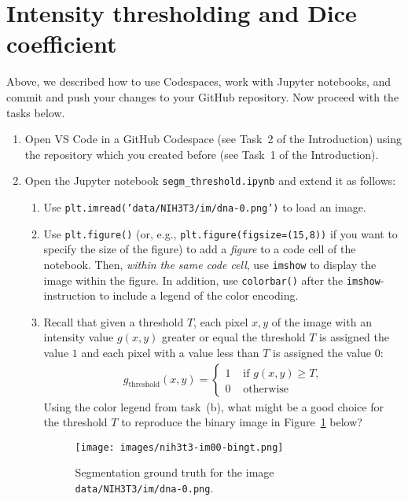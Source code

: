 \documentclass[12pt,a4paper]{article}
\begin{document}
\section{Intensity thresholding and Dice coefficient}
\label{task:threshold_segm}

Above, we described how to use Codespaces, work with Jupyter notebooks, and commit and push your changes to your GitHub repository. Now proceed with the tasks below.
\begin{enumerate}
    \item Open VS Code in a GitHub Codespace (see Task~2 of the Introduction) using the repository which you created before (see Task~1 of the Introduction).
    \item Open the Jupyter notebook \texttt{segm\_threshold.ipynb} and extend it as follows:
    \begin{enumerate}
        \item Use \texttt{plt.imread('data/NIH3T3/im/dna-0.png')} to load an image.
        \item Use \texttt{plt.figure()} (or, e.g., \texttt{plt.figure(figsize=(15,8))} if you want to specify the size of the figure) to add a \emph{figure} to a code cell of the notebook. Then, \emph{within the same code cell}, use \texttt{imshow} to display the image within the figure. In addition, use \texttt{colorbar()} after the \texttt{imshow}-instruction to include a legend of the color encoding.
        \item Recall that given a threshold $T$, each pixel $x,y$ of the image with an intensity value $g\left(x,y\right)$ greater or equal the threshold $T$ is assigned the value $1$ and each pixel with a value less than $T$ is assigned the value $0$:
        \begin{align*}
            g_\text{threshold}\left(x,y\right) = \begin{cases}
                1 & \text{ if $g\left(x,y\right) \geq T$,} \\
                0 & \text{ otherwise}
            \end{cases}
        \end{align*}
        Using the color legend from task~(b), what might be a good choice for the threshold $T$ to reproduce the binary image in Figure~\ref{fig:nih3t3-im00-bingt} below?
        \begin{figure}[h!]
            \centering
            \texttt{[image: images/nih3t3-im00-bingt.png]}
            \caption{Segmentation ground truth for the image \texttt{data/NIH3T3/im/dna-0.png}.}
            \label{fig:nih3t3-im00-bingt}
        \end{figure}
        

\end{enumerate}
\end{enumerate}
\end{document}
